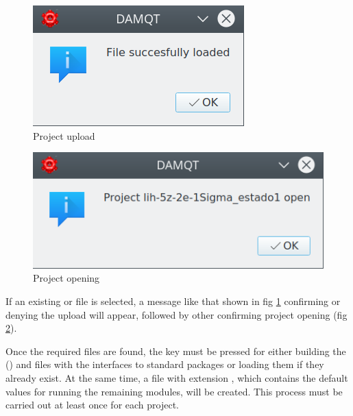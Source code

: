 \documentclass[10pt]{article}
\begin{document}
\begin{center}
\begin{minipage}{.25\linewidth}
\begin{figure}[H]
\begin{center}
\vspace*{-2mm}
\includegraphics[width=.6\linewidth]{damqt320_info_load.png}
\end{center}
\caption{Project upload \label{fig:2_1_3}}
\end{figure}
\end{minipage}
\begin{minipage}{.25\linewidth}
\begin{figure}[H]
\begin{center}
\vspace*{-2mm}
\includegraphics[width=.87\linewidth]{damqt320_info_open.png}
\end{center}
\caption{Project opening\label{fig:2_1_4}}
\end{figure}
\end{minipage}
\end{center}

If an existing \ggbs{ } or \sgbs{ } file is selected, a message
like that shown in fig \ref{fig:2_1_3} confirming or denying the upload will
appear, followed by other confirming project opening (fig \ref{fig:2_1_4}).

Once the required files are found, the key \exec
must be pressed for either building the \ggbs{ } (\sgbs) and \den{ } files with
the interfaces to standard packages or loading them if they already exist. At
the same time, a file with extension \damproj{ }, which contains the default
values for running the remaining modules, will be created. This process must be
carried out at least once for each project. 
\end{document}
